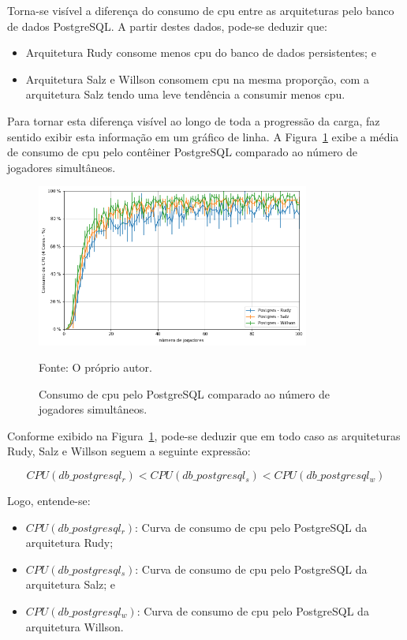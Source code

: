 Torna-se visível a diferença do consumo de \ac{cpu} entre as arquiteturas pelo banco de dados PostgreSQL.
%
A partir destes dados, pode-se deduzir que:

\begin{itemize}
 \item Arquitetura Rudy consome menos \ac{cpu} do banco de dados persistentes; e 
 \item Arquitetura Salz e Willson consomem \ac{cpu} na mesma proporção, com a arquitetura Salz tendo uma leve tendência a consumir menos \ac{cpu}.
\end{itemize}

Para tornar esta diferença visível ao longo de toda a progressão da carga, faz sentido exibir esta informação em um gráfico de linha.
%
A Figura~\ref{fig:cpu_db_media_por_jogador} exibe a média de consumo de \ac{cpu} pelo contêiner PostgreSQL comparado ao número de jogadores simultâneos.

\begin{figure}[htb!]
  \caption{Consumo de \ac{cpu} pelo PostgreSQL comparado ao número de jogadores simultâneos.}
  \label{fig:cpu_db_media_por_jogador}
  \includegraphics[width=0.8\textwidth]{figuras/analise/cpu_db_media_por_jogador.png}
  \centering

  Fonte: O próprio autor.
\end{figure}

Conforme exibido na Figura~\ref{fig:cpu_db_media_por_jogador}, pode-se deduzir que em todo caso as arquiteturas Rudy, Salz e Willson seguem a seguinte expressão:

$$
    CPU(db\_postgresql_{r}) < CPU(db\_postgresql_{s}) < CPU(db\_postgresql_{w})
$$

Logo, entende-se:

\begin{itemize}
\item $CPU(db\_postgresql_{r})$: Curva de consumo de \ac{cpu} pelo PostgreSQL da arquitetura Rudy;
\item $CPU(db\_postgresql_{s})$: Curva de consumo de \ac{cpu} pelo PostgreSQL da arquitetura Salz; e
\item $CPU(db\_postgresql_{w})$: Curva de consumo de \ac{cpu} pelo PostgreSQL da arquitetura Willson.
\end{itemize}

